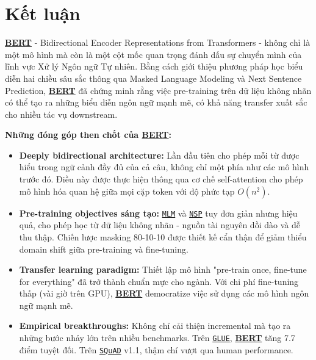 \section{Kết luận}
\label{sec:ket_luan}

\hyperref[acro:bert]{\textbf{BERT}} - Bidirectional Encoder Representations from Transformers \cite{devlin2018bert} - không chỉ là một mô hình mà còn là một cột mốc quan trọng đánh dấu sự chuyển mình của lĩnh vực Xử lý Ngôn ngữ Tự nhiên. Bằng cách giới thiệu phương pháp học biểu diễn hai chiều sâu sắc thông qua Masked Language Modeling và Next Sentence Prediction, \hyperref[acro:bert]{\textbf{BERT}} đã chứng minh rằng việc pre-training trên dữ liệu không nhãn có thể tạo ra những biểu diễn ngôn ngữ mạnh mẽ, có khả năng transfer xuất sắc cho nhiều tác vụ downstream.

\textbf{Những đóng góp then chốt của \hyperref[acro:bert]{\textbf{BERT}}:}
\begin{itemize}
    \item \textbf{Deeply bidirectional architecture:} Lần đầu tiên cho phép mỗi từ được hiểu trong ngữ cảnh đầy đủ của cả câu, không chỉ một phía như các mô hình trước đó. Điều này được thực hiện thông qua cơ chế self-attention cho phép mô hình hóa quan hệ giữa mọi cặp token với độ phức tạp $O(n^2)$.
    
    \item \textbf{Pre-training objectives sáng tạo:} \hyperref[acro:mlm]{\texttt{MLM}} và \hyperref[acro:nsp]{\texttt{NSP}} tuy đơn giản nhưng hiệu quả, cho phép học từ dữ liệu không nhãn - nguồn tài nguyên dồi dào và dễ thu thập. Chiến lược masking 80-10-10 được thiết kế cẩn thận để giảm thiểu domain shift giữa pre-training và fine-tuning.
    
    \item \textbf{Transfer learning paradigm:} Thiết lập mô hình "pre-train once, fine-tune for everything" đã trở thành chuẩn mực cho ngành. Với chi phí fine-tuning thấp (vài giờ trên GPU), \hyperref[acro:bert]{\textbf{BERT}} democratize việc sử dụng các mô hình ngôn ngữ mạnh mẽ.
    
    \item \textbf{Empirical breakthroughs:} Không chỉ cải thiện incremental mà tạo ra những bước nhảy lớn trên nhiều benchmarks. Trên \hyperref[acro:glue]{\texttt{GLUE}}, \hyperref[acro:bert]{\textbf{BERT}} tăng 7.7 điểm tuyệt đối. Trên \hyperref[acro:squad]{\texttt{SQuAD}} v1.1, thậm chí vượt qua human performance.
\end{itemize}

